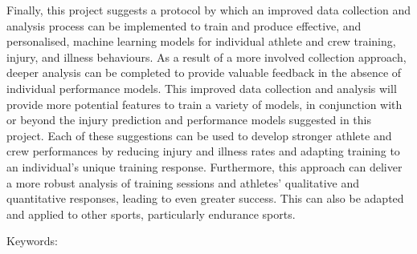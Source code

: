 Finally, this project suggests a protocol by which an improved data collection and analysis process can be implemented to train and produce effective, and personalised, machine learning models for individual athlete and crew training, injury, and illness behaviours. As a result of a more involved collection approach, deeper analysis can be completed to provide valuable feedback in the absence of individual performance models. This improved data collection and analysis will provide more potential features to train a variety of models, in conjunction with or beyond the injury prediction and performance models suggested in this project. Each of these suggestions can be used to develop stronger athlete and crew performances by reducing injury and illness rates and adapting training to an individual's unique training response. Furthermore, this approach can deliver a more robust analysis of training sessions and athletes' qualitative and quantitative responses, leading to even greater success. This can also be adapted and applied to other sports, particularly endurance sports.

Keywords: \keywords 